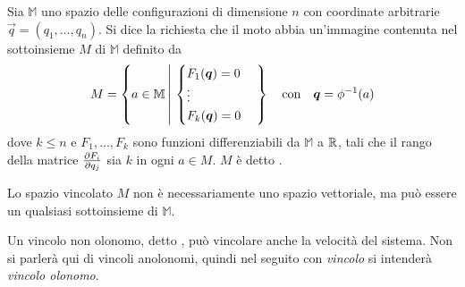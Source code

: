 \begin{definition}
  Sia $\mathbb{M}$ uno spazio delle configurazioni di dimensione $n$ con coordinate arbitrarie $\vec{q} = (q_1, \ldots, q_n)$. Si dice  la richiesta che il moto abbia un'immagine contenuta nel sottoinsieme $M$ di $\mathbb{M}$ definito da \begin{equation*}
    M = \left\{ a \in \mathbb{M} \left|\ \begin{cases} 
      F_1(\vec{q}) = 0 \\
      \vdots \\
      F_k(\vec{q}) = 0
    \end{cases} \right. \right\} \qqtext{con} \vec{q} = \phi^{-1}(a)
  \end{equation*} 
  dove $k \le n$ e $F_1, \ldots, F_k$ sono funzioni differenziabili da $\mathbb{M}$ a $\mathbb{R}$, tali che il rango della matrice $\pdv{F_i}{q_j}(a)$ sia $k$ in ogni $a \in M$. $M$ è detto .
\end{definition}
\begin{remark}
  Lo spazio vincolato $M$ non è necessariamente uno spazio vettoriale, ma può essere un qualsiasi sottoinsieme di $\mathbb{M}$.
\end{remark}
\begin{remark}
  Un vincolo non olonomo, detto , può vincolare anche la velocità del sistema. Non si parlerà qui di vincoli anolonomi, quindi nel seguito con \emph{vincolo} si intenderà \emph{vincolo olonomo}.
\end{remark}

